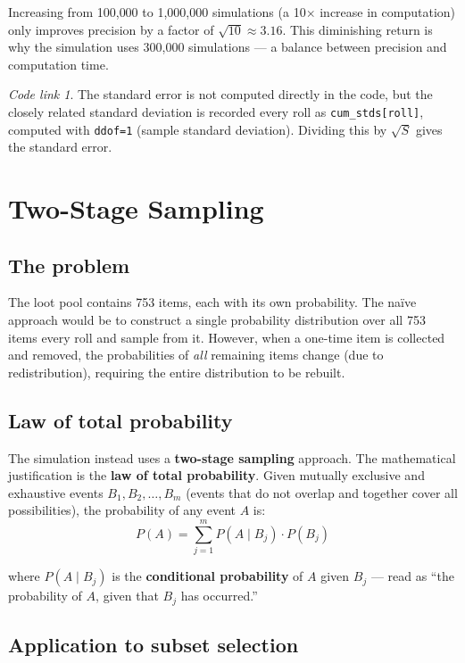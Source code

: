 \documentclass[11pt,a4paper]{article}
\theoremstyle{remark}
\newtheorem*{codelink}{Code link}
\begin{document}
Increasing from 100{,}000 to 1{,}000{,}000 simulations (a 10$\times$ increase in computation) only improves precision by a factor of $\sqrt{10} \approx 3.16$. This diminishing return is why the simulation uses 300{,}000 simulations --- a balance between precision and computation time.

\begin{codelink}
The standard error is not computed directly in the code, but the closely related standard deviation is recorded every roll as \texttt{cum\_stds[roll]}, computed with \texttt{ddof=1} (sample standard deviation). Dividing this by $\sqrt{S}$ gives the standard error.
\end{codelink}

\section{Two-Stage Sampling}

\subsection{The problem}

The loot pool contains 753 items, each with its own probability. The na\"ive approach would be to construct a single probability distribution over all 753 items every roll and sample from it. However, when a one-time item is collected and removed, the probabilities of \emph{all} remaining items change (due to redistribution), requiring the entire distribution to be rebuilt.

\subsection{Law of total probability}

The simulation instead uses a \textbf{two-stage sampling} approach. The mathematical justification is the \textbf{law of total probability}. Given mutually exclusive and exhaustive events $B_1, B_2, \ldots, B_m$ (events that do not overlap and together cover all possibilities), the probability of any event $A$ is:
\[
P(A) = \sum_{j=1}^{m} P(A \mid B_j) \cdot P(B_j)
\]

where $P(A \mid B_j)$ is the \textbf{conditional probability} of $A$ given $B_j$ --- read as ``the probability of $A$, given that $B_j$ has occurred.''

\subsection{Application to subset selection}
\end{document}
